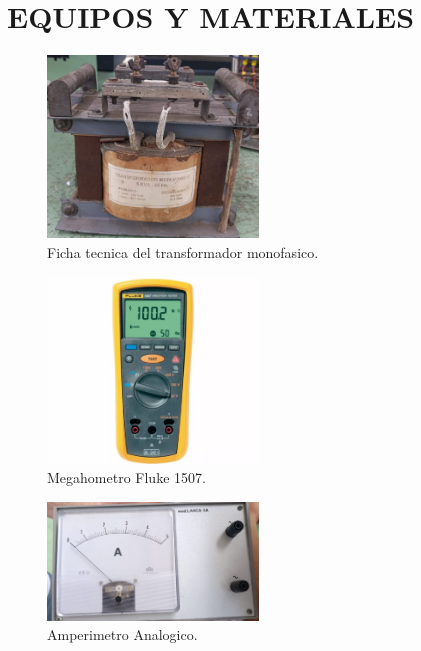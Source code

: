 \documentclass[a4paper, 12pt]{article}
\begin{document}
\section{EQUIPOS Y MATERIALES}
\begin{figure}[h] %
    \centering
    \includegraphics[width=0.5\textwidth]{img/Transformador monofasico.png} %
    \caption{Ficha tecnica del transformador monofasico.}
    \label{fig:mi_imagen}
\end{figure}
\begin{figure}[h] %
    \centering
    \includegraphics[width=0.5\textwidth]{img/Megahometro megger.png} %
    \caption{Megahometro Fluke 1507.}
    \label{fig:megahometro}
\end{figure}
\begin{figure}[h] %
    \centering
    \includegraphics[width=0.5\textwidth]{img/Amperimetro Analogico.png} %
    \caption{Amperimetro Analogico.}
    \label{fig:AmpAnalogico}
\end{figure}
\end{document}
